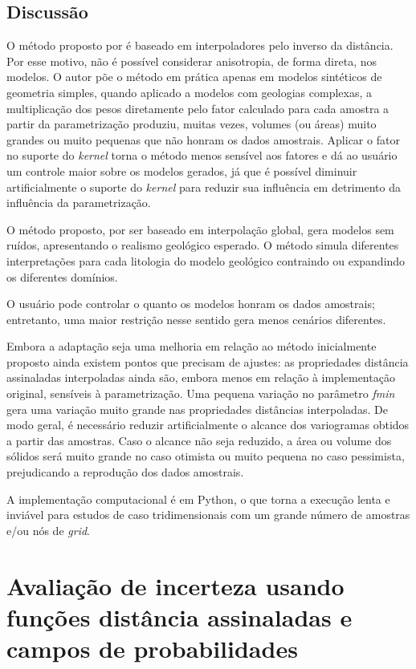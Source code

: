\subsection{Discussão}

O método proposto por  é baseado em interpoladores pelo inverso da distância. Por esse motivo, não é possível considerar anisotropia, de forma direta, nos modelos. O autor põe o método em prática apenas em modelos sintéticos de geometria simples, quando aplicado a modelos com geologias complexas, a multiplicação dos pesos diretamente pelo fator calculado para cada amostra a partir da parametrização produziu, muitas vezes, volumes (ou áreas) muito grandes ou muito pequenas que não honram os dados amostrais. Aplicar o fator no suporte do \textit{kernel} torna o método menos sensível aos fatores e dá ao usuário um controle maior sobre os modelos gerados, já que é possível diminuir artificialmente o suporte do \textit{kernel} para reduzir sua influência em detrimento da influência da parametrização.

O método proposto, por ser baseado em interpolação global, gera modelos sem ruídos, apresentando o realismo geológico esperado. O método simula diferentes interpretações para cada litologia do modelo geológico contraindo ou expandindo os diferentes domínios. 

O usuário pode controlar o quanto os modelos honram os dados amostrais; entretanto, uma maior restrição nesse sentido gera menos cenários diferentes.

Embora a adaptação seja uma melhoria em relação ao método inicialmente proposto ainda existem pontos que precisam de ajustes: as propriedades distância assinaladas interpoladas ainda são, embora menos em relação à implementação original, sensíveis à parametrização. Uma pequena variação no parâmetro \textit{fmin} gera uma variação muito grande nas propriedades distâncias interpoladas. De modo geral, é necessário reduzir artificialmente o alcance dos variogramas obtidos a partir das amostras. Caso o alcance não seja reduzido, a área ou volume dos sólidos será muito grande no caso otimista ou muito pequena no caso pessimista, prejudicando a reprodução dos dados amostrais.

A implementação computacional é em Python, o que torna a execução lenta e inviável para estudos de caso tridimensionais com um grande número de amostras e/ou nós de \textit{grid}.

\section{Avaliação de incerteza usando funções distância assinaladas e campos de probabilidades}\label{pfiels_sec}

